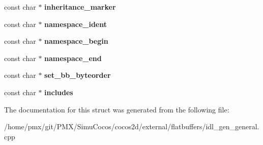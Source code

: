 \begin{DoxyCompactItemize}
\mbox{\label{structflatbuffers_1_1LanguageParameters_a28a42672133a4cd300cd8a6e8f12d674}} 
const char $\ast$ {\bfseries inheritance\+\_\+marker}
\item 
\mbox{\label{structflatbuffers_1_1LanguageParameters_a59098af601177d2bfadedc0e5ddfa82f}} 
const char $\ast$ {\bfseries namespace\+\_\+ident}
\item 
\mbox{\label{structflatbuffers_1_1LanguageParameters_a7571467a0eec5f66c3669d4cd1b8b8c6}} 
const char $\ast$ {\bfseries namespace\+\_\+begin}
\item 
\mbox{\label{structflatbuffers_1_1LanguageParameters_afcc2ae109e56c8ea1d94fcfa8b69e550}} 
const char $\ast$ {\bfseries namespace\+\_\+end}
\item 
\mbox{\label{structflatbuffers_1_1LanguageParameters_a14896e563f0131b88817b86f2d6038b8}} 
const char $\ast$ {\bfseries set\+\_\+bb\+\_\+byteorder}
\item 
\mbox{\label{structflatbuffers_1_1LanguageParameters_a66b2e4569243c1769819f4081cd088a4}} 
const char $\ast$ {\bfseries includes}
\end{DoxyCompactItemize}


The documentation for this struct was generated from the following file\+:\begin{DoxyCompactItemize}
\item 
/home/pmx/git/\+P\+M\+X/\+Simu\+Cocos/cocos2d/external/flatbuffers/idl\+\_\+gen\+\_\+general.\+cpp\end{DoxyCompactItemize}
